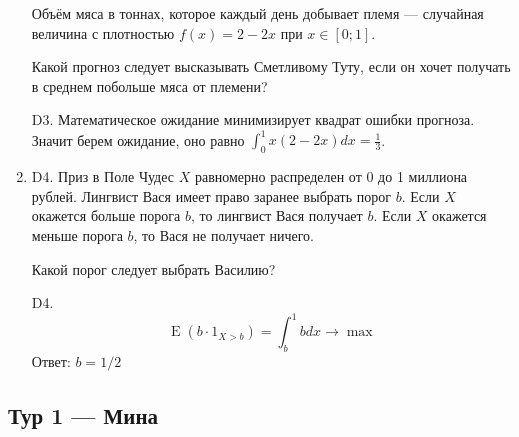 \documentclass[12pt]{article}
\DeclareMathOperator{\E}{E}
\newenvironment{problem}{}{}
\newenvironment{sol}{}{} %
\begin{document}
\begin{enumerate}
\begin{problem}
Объём мяса в тоннах, которое каждый день добывает племя — случайная величина с плотностью $f(x)=2-2x$ при $x\in [0;1]$.

Какой прогноз следует высказывать Сметливому Туту, если он хочет получать в среднем побольше мяса от племени?

\begin{sol}
D3. Математическое ожидание минимизирует квадрат ошибки прогноза. Значит берем ожидание, оно равно $\int_0^1 x (2-2x) dx = \frac{1}{3}$.
\end{sol}
\end{problem}


\begin{problem}
\item[D4.] Приз в Поле Чудес $X$ равномерно распределен от 0 до 1 миллиона рублей. Лингвист Вася имеет право заранее выбрать порог $b$. Если $X$ окажется больше порога $b$, то лингвист Вася получает $b$. Если $X$ окажется меньше порога $b$, то Вася не получает ничего.

Какой порог следует выбрать Василию?

\begin{sol}
D4. 
\[
\E(b\cdot 1_{X>b})=\int_b^1 b dx \to \max 
\]
Ответ: $b=1/2$

\end{sol}
\end{problem}
\end{enumerate}



\newpage
\subsection{Тур 1 — Мина}
\end{document}
